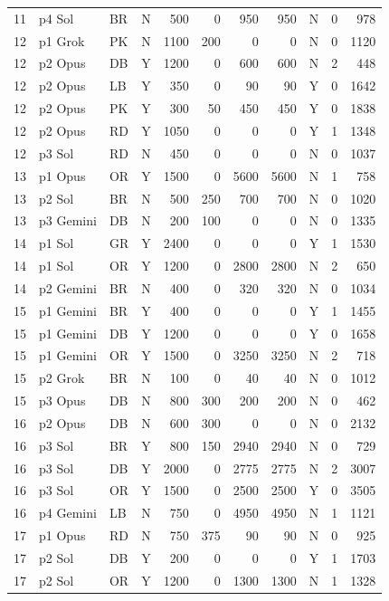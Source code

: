 \begin{longtable}{r l l l r r r r l r r}
11 & p4 Sol & BR & N & 500 & 0 & 950 & 950 & N & 0 & 978 \\
12 & p1 Grok & PK & N & 1100 & 200 & 0 & 0 & N & 0 & 1120 \\
12 & p2 Opus & DB & Y & 1200 & 0 & 600 & 600 & N & 2 & 448 \\
12 & p2 Opus & LB & Y & 350 & 0 & 90 & 90 & Y & 0 & 1642 \\
12 & p2 Opus & PK & Y & 300 & 50 & 450 & 450 & Y & 0 & 1838 \\
12 & p2 Opus & RD & Y & 1050 & 0 & 0 & 0 & Y & 1 & 1348 \\
12 & p3 Sol & RD & N & 450 & 0 & 0 & 0 & N & 0 & 1037 \\
13 & p1 Opus & OR & Y & 1500 & 0 & 5600 & 5600 & N & 1 & 758 \\
13 & p2 Sol & BR & N & 500 & 250 & 700 & 700 & N & 0 & 1020 \\
13 & p3 Gemini & DB & N & 200 & 100 & 0 & 0 & N & 0 & 1335 \\
14 & p1 Sol & GR & Y & 2400 & 0 & 0 & 0 & Y & 1 & 1530 \\
14 & p1 Sol & OR & Y & 1200 & 0 & 2800 & 2800 & N & 2 & 650 \\
14 & p2 Gemini & BR & N & 400 & 0 & 320 & 320 & N & 0 & 1034 \\
15 & p1 Gemini & BR & Y & 400 & 0 & 0 & 0 & Y & 1 & 1455 \\
15 & p1 Gemini & DB & Y & 1200 & 0 & 0 & 0 & Y & 0 & 1658 \\
15 & p1 Gemini & OR & Y & 1500 & 0 & 3250 & 3250 & N & 2 & 718 \\
15 & p2 Grok & BR & N & 100 & 0 & 40 & 40 & N & 0 & 1012 \\
15 & p3 Opus & DB & N & 800 & 300 & 200 & 200 & N & 0 & 462 \\
16 & p2 Opus & DB & N & 600 & 300 & 0 & 0 & N & 0 & 2132 \\
16 & p3 Sol & BR & Y & 800 & 150 & 2940 & 2940 & N & 0 & 729 \\
16 & p3 Sol & DB & Y & 2000 & 0 & 2775 & 2775 & N & 2 & 3007 \\
16 & p3 Sol & OR & Y & 1500 & 0 & 2500 & 2500 & Y & 0 & 3505 \\
16 & p4 Gemini & LB & N & 750 & 0 & 4950 & 4950 & N & 1 & 1121 \\
17 & p1 Opus & RD & N & 750 & 375 & 90 & 90 & N & 0 & 925 \\
17 & p2 Sol & DB & Y & 200 & 0 & 0 & 0 & Y & 1 & 1703 \\
17 & p2 Sol & OR & Y & 1200 & 0 & 1300 & 1300 & N & 1 & 1328 \\

\end{longtable}
